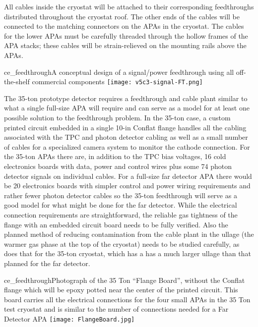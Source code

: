 All cables inside the cryostat will be attached to their corresponding feedthroughs distributed throughout the cryostat roof.
The other ends of the cables will be connected to the matching connectors on the APAs in the cryostat.
The cables for the lower APAs must be carefully threaded through the hollow frames of the APA stacks;
these cables will be strain-relieved on the mounting rails above the APAs. 


\begin{cdrfigure}{ce_feedthrough}{A conceptual design of a signal/power feedthrough using all off-the-shelf commercial components}
\texttt{[image: v5c3-signal-FT.png]}
\end{cdrfigure}

The 35-ton prototype detector requires a feedthrough and cable plant similar to what a single full-size APA
will require and can serve as a model for at least one possible solution to the feedthrough problem.
In the 35-ton case, a custom printed circuit embedded in a single 10-in Conflat flange handles all the cabling
associated with the TPC and photon detector cabling as well as a small number of cables for a specialized
camera system to monitor the cathode connection.
For the 35-ton APAs there are, in addition to the TPC bias voltages, 16 cold electronics boards with data,
power and control wires plus some 74 photon detector signals on individual cables.
For a full-size far detector APA there would be 20 electronics boards with simpler control and power wiring
requirements and rather fewer photon detector cables so the 35-ton feedthrough will serve as a good model
for what might be done for the far detector.
While the electrical connection requirements are straightforward,
the reliable gas tightness of the flange with an embedded circuit board needs to be fully verified.
Also the planned method of reducing contamination from the cable plant in the ullage (the warmer gas phase at the top of the cryostat) 
needs to be studied carefully, as does that for the 35-ton cryostat, which has a has a much larger ullage than that planned for the far detector.


\begin{cdrfigure}{ce_feedthrough}{Photograph of the 35 Ton ``Flange Board'', without the Conflat flange which will be epoxy potted near
  the center of the printed circuit.
  This board carries all the electrical connections for the four small APAs in the 35 Ton
  test cryostat and is similar to the number of connections needed for a Far Detector APA}
\texttt{[image: FlangeBoard.jpg]}
\end{cdrfigure}

